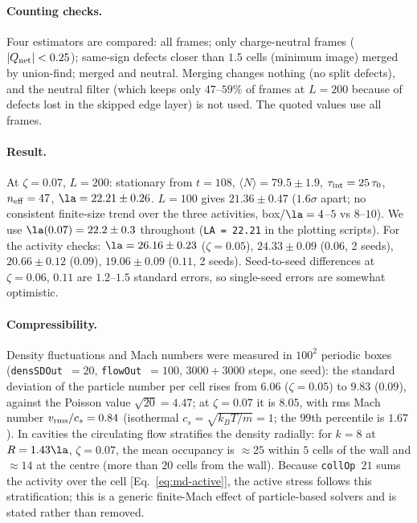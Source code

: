 \paragraph{Counting checks.} Four estimators are compared: all frames; only charge-neutral frames ($|Q_{\rm net}|<0.25$); same-sign defects
closer than $1.5$ cells (minimum image) merged by union-find; merged and neutral. Merging changes nothing (no split defects), and the
neutral filter (which keeps only $47$--$59\%$ of frames at $L=200$ because of defects lost in the skipped edge layer) is not used. The
quoted values use all frames.

\paragraph{Result.} At $\zeta=0.07$, $L=200$: stationary from $t=108$, $\langle N\rangle=79.5\pm1.9$, $\tau_{\rm int}=25\,\tau_0$,
$n_{\rm eff}=47$, $\la=22.21\pm0.26$. $L=100$ gives $21.36\pm0.47$ ($1.6\sigma$ apart; no consistent finite-size trend over the three
activities, box$/\la=4$--$5$ vs $8$--$10$). We use $\la(0.07)=22.2\pm0.3$ throughout (\texttt{LA = 22.21} in the plotting scripts).
For the activity checks: $\la=26.16\pm0.23$ ($\zeta=0.05$), $24.33\pm0.09$ ($0.06$, 2 seeds), $20.66\pm0.12$ ($0.09$), $19.06\pm0.09$ ($0.11$,
2 seeds). Seed-to-seed differences at $\zeta=0.06$, $0.11$ are $1.2$--$1.5$ standard errors, so single-seed errors are somewhat optimistic.

\paragraph{Compressibility.} Density fluctuations and Mach numbers were measured in $100^2$ periodic boxes
(\texttt{densSDOut}~$=20$, \texttt{flowOut}~$=100$, $3000+3000$ steps, one seed): the standard deviation of the particle number per
cell rises from $6.06$ ($\zeta=0.05$) to $9.83$ ($0.09$), against the Poisson value $\sqrt{20}=4.47$; at $\zeta=0.07$ it is $8.05$, with
rms Mach number $v_{\rm rms}/c_s=0.84$ (isothermal $c_s=\sqrt{k_BT/m}=1$; the $99$th percentile is $1.67$). In cavities the circulating
flow stratifies the density radially: for $k=8$ at $R=1.43\la$, $\zeta=0.07$, the mean occupancy is $\approx25$ within $5$ cells of the
wall and $\approx14$ at the centre (more than $20$ cells from the wall). Because \texttt{collOp}~$21$ sums the activity over the cell
[Eq.~\eqref{eq:md-active}], the active stress follows this stratification; this is a generic finite-Mach effect of particle-based
solvers and is stated rather than removed.

